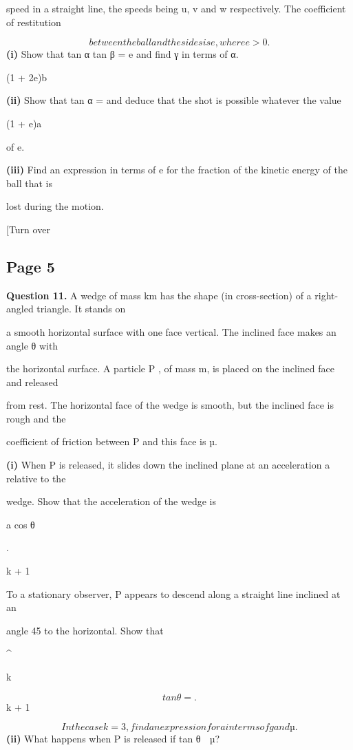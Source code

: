 \documentclass[12pt]{article}
\begin{document}
\begin{flushleft}
speed in a straight line, the speeds being u, v and w respectively. The coefficient of restitution\par
\[between the ball and the sides is e, where e > 0.\]
\textbf{(i)} Show that tan α tan β = e and find γ in terms of α.\par
(1 + 2e)b\par
\textbf{(ii)} Show that tan α = and deduce that the shot is possible whatever the value\par
(1 + e)a\par
of e.\par
\textbf{(iii)} Find an expression in terms of e for the fraction of the kinetic energy of the ball that is\par
lost during the motion.\par
[Turn over\par
\end{flushleft}
\subsection*{Page 5}
\begin{flushleft}
\bigskip\textbf{Question 11.} A wedge of mass km has the shape (in cross-section) of a right-angled triangle. It stands on\par
a smooth horizontal surface with one face vertical. The inclined face makes an angle θ with\par
the horizontal surface. A particle P , of mass m, is placed on the inclined face and released\par
from rest. The horizontal face of the wedge is smooth, but the inclined face is rough and the\par
coefficient of friction between P and this face is µ.\par
\textbf{(i)} When P is released, it slides down the inclined plane at an acceleration a relative to the\par
wedge. Show that the acceleration of the wedge is\par
a cos θ\par
.\par
k + 1\par
To a stationary observer, P appears to descend along a straight line inclined at an\par
angle 45 to the horizontal. Show that\par
\textasciicircum{}\circ\par
k\par
\[tan θ = .\]
k + 1\par
\[In the case k = 3, find an expression for a in terms of g and µ.\]
\textbf{(ii)} What happens when P is released if tan θ  µ?\par
\end{flushleft}
\end{document}
